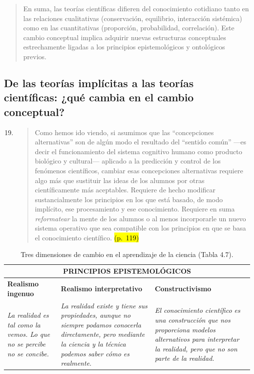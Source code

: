 \documentclass{article}
\begin{document}
\begin{quote}
En suma, las teorías científicas difieren del conocimiento cotidiano tanto en las relaciones cualitativas (conservación, equilibrio, interacción sistémica) como en las cuantitativas (proporción, probabilidad, correlación). Este cambio conceptual implica adquirir nuevas estructuras conceptuales estrechamente ligadas a los principios epistemológicos y ontológicos previos. 
\end{quote}

\setcounter{enumi}{18}
\subsection*{De las teorías implícitas a las teorías científicas: ¿qué cambia en el cambio conceptual?}

\begin{enumerate}
  \setcounter{enumi}{18}
  \item \begin{quote}
  Como hemos ido viendo, si asumimos que las “concepciones alternativas” son de algún modo el resultado del “sentido común” —es decir el funcionamiento del sistema cognitivo humano como producto biológico y cultural— aplicado a la predicción y control de los fenómenos científicos, cambiar esas concepciones alternativas requiere algo más que sustituir las ideas de los alumnos por otras científicamente más aceptables. Requiere de hecho modificar sustancialmente los principios en los que está basado, de modo implícito, ese procesamiento y ese conocimiento. Requiere en suma \textit{reformatear} la mente de los alumnos o al menos incorporarle un nuevo sistema operativo que sea compatible con los principios en que se basa el conocimiento científico. \hl{(p.~119)}
  \end{quote}
\end{enumerate}

\begin{table}[H]
\centering
\caption{Tres dimensiones de cambio en el aprendizaje de la ciencia (Tabla 4.7).}
\begin{tabular}{|p{4.8cm}|p{4.8cm}|p{4.8cm}|}
\hline
\multicolumn{3}{|c|}{\textbf{PRINCIPIOS EPISTEMOLÓGICOS}} \\ \hline
\textbf{Realismo ingenuo} & \textbf{Realismo interpretativo} & \textbf{Constructivismo} \\ \hline
\textit{La realidad es tal como la vemos. Lo que no se percibe no se concibe.} &
\textit{La realidad existe y tiene sus propiedades, aunque no siempre podamos conocerla directamente, pero mediante la ciencia y la técnica podemos saber cómo es realmente.} &
\textit{El conocimiento científico es una construcción que nos proporciona modelos alternativos para interpretar la realidad, pero que no son parte de la realidad.} \\ \hline
\end{tabular}
\end{table}
\end{document}
